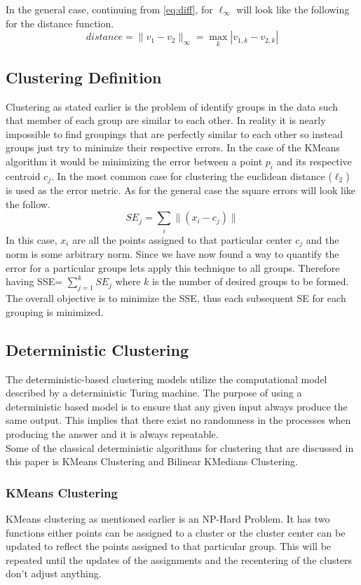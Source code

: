 \documentclass[a4paper,12pt]{article}
\numberwithin{equation}{section}
\begin{document}
In the general case, continuing from \eqref{eq:diff}, for $\ell_\infty$ will look like the following for the distance function.
\begin{equation}
    distance =  \|v_1- v_2\|_\infty = \max_k |v_{1,k} - v_{2,k}|
\end{equation}
\subsection{Clustering Definition} \label{sec:clustering_def}
Clustering as stated earlier is the problem of identify groups in the data such that member of each group are similar to each other. In reality it is nearly impossible to find groupings that are perfectly similar to each other so instead groups just try to minimize their respective errors. In the case of the KMeans algorithm it would be minimizing the error between a point $p_i$ and its respective centroid $c_j$. In the most common case for clustering the euclidean distance ($\ell_2$) is used as the error metric. As for the general case the square errors will look like the follow.  
\begin{equation}
SE_j = \sum_i \|(x_i- c_j) \| 
\end{equation}
In this case, $x_i$ are all the points assigned to that particular center $c_j$ and the norm is some arbitrary norm. Since we have now found a way to quantify the error for a particular groups lets apply this technique to all groups. Therefore having SSE= $\sum\limits_{j=1}^{k} SE_j$ where $k$ is the number of desired groups to be formed. The overall objective is to minimize the SSE, thus each subsequent SE for each grouping is minimized. 

\subsection{Deterministic Clustering} \label{sec:deterministic}
The deterministic-based clustering models utilize the computational model described by a deterministic Turing machine. The purpose of using a deterministic based model is to ensure that any given input always produce the same output. This implies that there exist no randomness in the processes when producing the answer and it is always repeatable. \\

Some of the classical deterministic algorithms for clustering that are discussed in this paper is KMeans Clustering and Bilinear KMedians Clustering. 

\subsubsection{KMeans Clustering}
KMeans clustering as mentioned earlier is an NP-Hard Problem\cite{mahajan_nimbhorkar_varadarajan_2009}. It has two functions either points can be assigned to a cluster or the cluster center can be updated to reflect the points assigned to that particular group. This will be repeated until the updates of the assignments and the recentering of the clusters don't adjust anything.  \\
\end{document}
